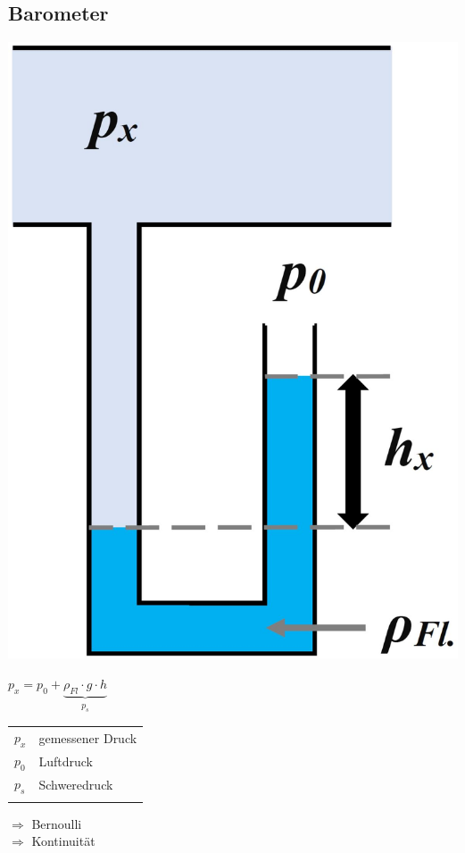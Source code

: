 \subsection{Barometer}
\begin{minipage}{0.4\linewidth}
\includegraphics[width=\linewidth]{Bilder/manometer} \\
\end{minipage}
\hfill
\begin{minipage}{0.5\linewidth}
$\boxed{ p_x = p_0 + \underbrace{ \rho_{Fl} \cdot g \cdot h}_{\substack{p_s}} }$
 
 
\begin{tabular}{ll}
\\
$p_x$ & gemessener Druck \\
$p_0$ & Luftdruck \\
$p_s$ & Schweredruck \\
\\
\end{tabular}

$\Rightarrow$ Bernoulli \\
$\Rightarrow$ Kontinuität \\
\\
\\
\\
\\
\\
\end{minipage}




